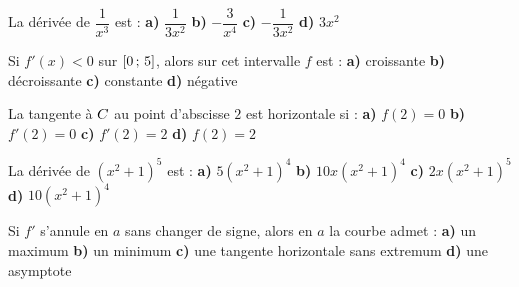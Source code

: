 \begin{qcm}
\exo La dérivée de $\dfrac{1}{x^{3}}$ est :
\textbf{a)} $\dfrac{1}{3x^{2}}$ \quad \textbf{b)} $-\dfrac{3}{x^{4}}$ \quad
\textbf{c)} $-\dfrac{1}{3x^{2}}$ \quad \textbf{d)} $3x^{2}$

\exo Si $f'(x) < 0$ sur $\left[0\,;\,5\right]$, alors sur cet intervalle $f$
est :
\textbf{a)} croissante \quad \textbf{b)} décroissante \quad
\textbf{c)} constante \quad \textbf{d)} négative 

\exo La tangente à $C$ au point d'abscisse $2$ est horizontale si :
\textbf{a)} $f(2) = 0$ \quad \textbf{b)} $f'(2) = 0$ \quad
\textbf{c)} $f'(2) = 2$ \quad \textbf{d)} $f(2) = 2$ 

\exo La dérivée de $(x^{2}+1)^{5}$ est :
\textbf{a)} $5(x^{2}+1)^{4}$ \quad \textbf{b)} $10x(x^{2}+1)^{4}$ \quad
\textbf{c)} $2x(x^{2}+1)^{5}$ \quad \textbf{d)} $10(x^{2}+1)^{4}$

\exo Si $f'$ s'annule en $a$ sans changer de signe, alors en $a$ la courbe
admet :
\textbf{a)} un maximum \quad \textbf{b)} un minimum \quad
\textbf{c)} une tangente horizontale sans extremum \quad
\textbf{d)} une asymptote 
\end{qcm}

